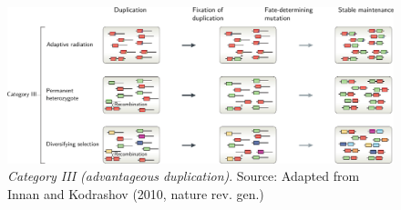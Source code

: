 \documentclass[aspectratio=169, 9pt]{beamer}
\begin{document}
\begin{frame}[t]
	\begin{figure}
		\includegraphics[width=1\linewidth]{innan-kodrashov-category-iiI.pdf}
		\caption{\textit{Category III (advantageous duplication)}. {\footnotesize Source: Adapted from Innan and Kodrashov (2010, nature rev. gen.)}}
	\end{figure}
	\vfill\hfill%
\end{frame}


\end{document}
